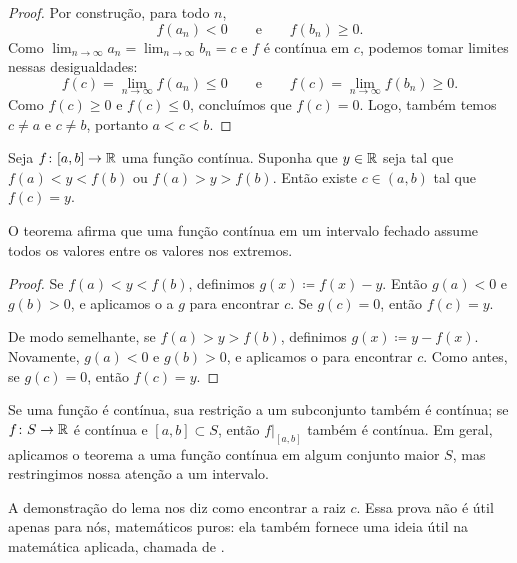 \begin{proof}
Por construção, para todo $n$,
\begin{equation*}
f(a_n) < 0
\qquad \text{e} \qquad
f(b_n) \geq 0 .
\end{equation*}
Como
$\lim_{n\to\infty} a_n = \lim_{n\to\infty} b_n = c$
e $f$ é contínua em $c$, podemos tomar limites nessas desigualdades:
\begin{equation*}
f(c) = \lim_{n\to\infty} f(a_n) \leq 0
\qquad \text{e} \qquad
f(c) = \lim_{n\to\infty} f(b_n) \geq 0 .
\end{equation*}
Como $f(c) \geq 0$ e $f(c) \leq 0$, concluímos que $f(c) = 0$.
Logo, também temos $c \neq a$ e $c \neq b$, portanto $a < c < b$.
\end{proof}

\begin{thm} \label{IVT:thm}
Seja $f \colon [a,b] \to {\mathbb{R}}$ uma função contínua.
Suponha que $y \in {\mathbb{R}}$ seja tal que $f(a) < y < f(b)$
ou $f(a) > y > f(b)$. Então existe $c \in (a,b)$
tal que $f(c) = y$.
\end{thm}

O teorema afirma que uma função contínua em um intervalo fechado
assume todos os valores entre os valores nos extremos.

\begin{proof}
Se $f(a) < y < f(b)$, definimos $g(x) \coloneqq f(x)-y$. Então
$g(a) < 0$ e $g(b) > 0$, e aplicamos o 
a $g$ para encontrar $c$. Se $g(c) = 0$, então $f(c) = y$.

De modo semelhante, se $f(a) > y > f(b)$, definimos
$g(x) \coloneqq y-f(x)$. Novamente, $g(a) < 0$ e $g(b) > 0$,
e aplicamos o  para encontrar $c$.
Como antes, se $g(c) = 0$, então $f(c) = y$.
\end{proof}

Se uma função é contínua, sua restrição a um subconjunto também é contínua;
se $f \colon S \to {\mathbb{R}}$ é contínua e $[a,b] \subset S$, então
$f|_{[a,b]}$ também é contínua. Em geral, aplicamos o teorema a uma função
contínua em algum conjunto maior $S$, mas restringimos nossa atenção a um
intervalo.

A demonstração do lema nos diz como encontrar a raiz $c$. Essa prova não é útil
apenas para nós, matemáticos puros: ela também fornece uma ideia útil na
matemática aplicada, chamada de \emph{}.

